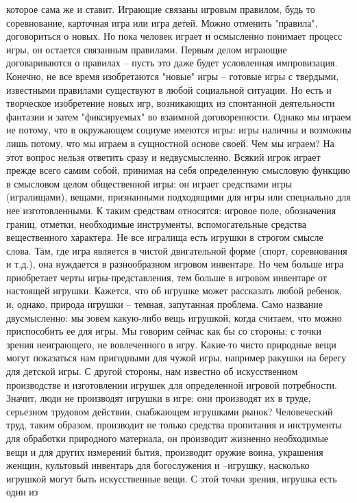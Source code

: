 \documentclass[12pt]{article}
\begin{document}
которое сама же и ставит. Играющие связаны игровым правилом, будь то соревнование, карточная игра или игра
детей. Можно отменить "правила", договориться о новых. Но пока человек играет и осмысленно понимает
процесс игры, он остается связанным правилами. Первым делом играющие договариваются о правилах -- пусть
это даже будет условленная импровизация. Конечно, не все время изобретаются "новые" игры -- готовые игры с
твердыми,  известными  правилами  существуют  в  любой  социальной  ситуации.  Но  есть  и  творческое
изобретение  новых  игр,  возникающих  из  спонтанной  деятельности  фантазии  и  затем  "фиксируемых"  во 
взаимной договоренности. Однако мы играем не потому, что в окружающем социуме имеются игры: игры
наличны и возможны лишь потому, что мы играем в сущностной основе своей.
Чем мы играем? На этот вопрос нельзя ответить сразу и недвусмысленно. Всякий игрок играет прежде всего
самим собой, принимая на себя определенную смысловую функцию в смысловом целом общественной игры: он
играет средствами игры (игралищами), вещами, признанными подходящими для игры или специально для нее
изготовленными.  К  таким  средствам  относятся:  игровое  поле,  обозначения  границ,  отметки,  необходимые
инструменты, вспомогательные средства вещественного характера. Не все игралища есть игрушки в строгом
смысле слова. Там, где игра является в чистой двигательной форме (спорт, соревнования и т.д.), она нуждается в
разнообразном игровом инвентаре. Но чем больше игра приобретает черты игры-представления, тем больше в
игровом инвентаре от настоящей игрушки. Кажется, что об игрушке может рассказать любой ребенок, и, однако,
природа игрушки -- темная, запутанная проблема. Само название двусмысленно: мы зовем какую-либо вещь
игрушкой, когда считаем, что можно приспособить ее для игры. Мы говорим сейчас как бы со стороны; с точки
зрения  неиграющего,  не  вовлеченного  в  игру.  Какие-то  чисто  природные  вещи  могут  показаться  нам
пригодными для чужой игры, например ракушки на берегу для детской игры. С другой стороны, нам известно
об искусственном производстве и изготовлении игрушек для определенной игровой потребности. Значит, люди
не  производят  игрушки  в  игре:  они  производят  их  в  труде,  серьезном  трудовом  действии,  снабжающем
игрушками  рынок?  Человеческий  труд,  таким  образом,  производит  не  только  средства  пропитания  и
инструменты для обработки природного материала, он производит жизненно необходимые вещи и для других
измерений бытия, производит оружие воина, украшения женщин, культовый инвентарь для богослужения и --игрушку, насколько игрушкой могут быть искусственные вещи. С этой точки зрения, игрушка есть один из
\end{document}
